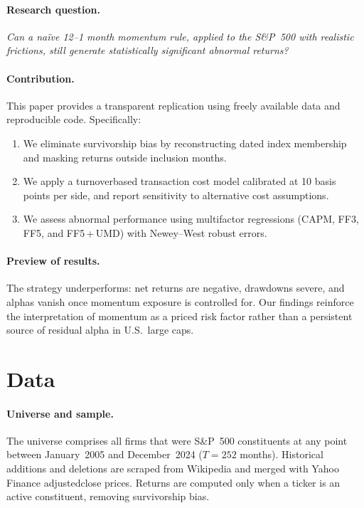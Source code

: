 \documentclass[11pt]{article}
\begin{document}
\paragraph{Research question.}
\emph{Can a naïve 12--1 month momentum rule, applied to the S\&P~500 with realistic frictions, still generate statistically significant abnormal returns?}

\paragraph{Contribution.}
This paper provides a transparent replication using freely available data and reproducible code. Specifically:
\begin{enumerate}[label=(\roman*), leftmargin=*]
  \item We eliminate survivorship bias by reconstructing dated index membership and masking returns outside inclusion months.
  \item We apply a turnover\textendash based transaction cost model calibrated at 10 basis points per side, and report sensitivity to alternative cost assumptions.
  \item We assess abnormal performance using multi\textendash factor regressions (CAPM, FF3, FF5, and FF5\,+\,UMD) with Newey--West robust errors.
\end{enumerate}

\paragraph{Preview of results.}
The strategy underperforms: net returns are negative, drawdowns severe, and alphas vanish once momentum exposure is controlled for. Our findings reinforce the interpretation of momentum as a priced risk factor rather than a persistent source of residual alpha in U.S.\ large caps.

\section{Data} \label{sec:data}
\paragraph{Universe and sample.}
The universe comprises all firms that were S\&P~500 constituents at any point between January~2005 and December~2024 (\(T{=}252\) months). Historical additions and deletions are scraped from Wikipedia and merged with Yahoo Finance adjusted\textendash close prices. Returns are computed only when a ticker is an active constituent, removing survivorship bias.
\end{document}
